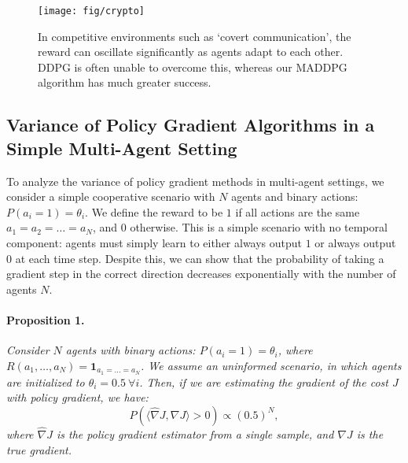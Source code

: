 \documentclass{article}
\begin{document}
\iffalse
\begin{figure}
\centering
\texttt{[image: fig/speak\_list\_succ2]}
\caption{\label{fig:speak_list_succ2} The success rate of MADDPG against traditional RL approaches on cooperative communication. RL algorithms are super-imposed on the success=0 line.  \vspace{-4mm}}
\end{figure}
\fi

\begin{figure}
\centering
\texttt{[image: fig/crypto]}
\caption{\label{fig:crypto} In competitive environments such as `covert communication', the reward can oscillate significantly as agents adapt to each other. DDPG is often unable to overcome this, whereas our MADDPG algorithm has much greater success. \vspace{-3mm}}
\end{figure}

\newpage

\subsection*{Variance of Policy Gradient Algorithms in a Simple Multi-Agent Setting}
\label{sec:variance}
To analyze the variance of policy gradient methods in multi-agent settings, we consider a simple cooperative scenario with $N$ agents and binary actions: $P(a_i=1) = \theta_i$. We define the reward to be $1$ if all actions are the same $a_1=a_2=\ldots=a_N$, and $0$ otherwise. This is a simple scenario with no temporal component: agents must simply learn to either always output $1$ or always output $0$ at each time step. Despite this, we can show that the probability of taking a gradient step in the correct direction decreases exponentially with the number of agents $N$.

\paragraph{Proposition 1.}
\textit{
Consider $N$ agents with binary actions: $P(a_i=1) = \theta_i$, where $R(a_1,\dots,a_N) = \mathbf{1}_{a_1=\dots=a_N}$. We assume an uninformed scenario, in which agents are initialized to $\theta_i=0.5 \ \forall i$. Then, if we are estimating the gradient of the cost $J$ with policy gradient, we have:
$$P(\langle \hat{\nabla} J, \nabla J \rangle > 0) \propto (0.5)^N,$$
where $\hat{\nabla} J$ is the policy gradient estimator from a single sample, and $\nabla J$ is the true gradient.
}
\end{document}

